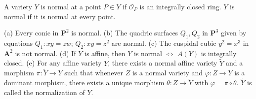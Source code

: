 A variety $Y$ is normal at a point $P \in Y$ if $\mathcal{O}_P$ is an integrally closed ring. $Y$ is normal if it is normal at every point.

(a) Every conic in $\mathbf{P}^2$ is normal.
(b) The quadric surfaces $Q_1, Q_2$ in $\mathbf{P}^3$ given by equations $Q_1: xy = zw$; $Q_2: xy = z^2$ are normal.
(c) The cuspidal cubic $y^2 = x^3$ in $\mathbf{A}^2$ is not normal.
(d) If $Y$ is affine, then $Y$ is normal $\iff$ $A(Y)$ is integrally closed.
(e) For any affine variety $Y$, there exists a normal affine variety $\tilde{Y}$ and a morphism $\pi: \tilde{Y} \to Y$ such that whenever $Z$ is a normal variety and $\varphi: Z \to Y$ is a dominant morphism, there exists a unique morphism $\theta: Z \to \tilde{Y}$ with $\varphi = \pi \circ \theta$. $\tilde{Y}$ is called the normalization of $Y$.
